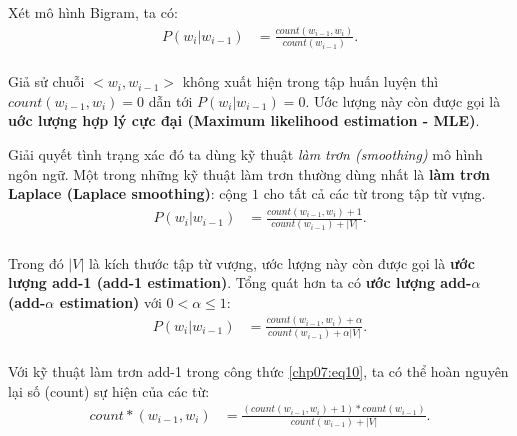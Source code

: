 Xét mô hình Bigram, ta có:
\begin{equation}
\begin{split}
P(w_i|w_{i-1})&=\frac{count(w_{i-1},w_i)}{count(w_{i-1})}.\\
\end{split}
\end{equation}

Giả sử chuỗi $<w_i,w_{i-1}>$ không xuất hiện trong tập huấn luyện thì $count(w_{i-1},w_i)=0$ dẫn tới $P(w_i|w_{i-1})=0$. Ước lượng này còn được gọi là \textbf{uớc lượng hợp lý cực đại (Maximum likelihood estimation - MLE)}.

Giải quyết tình trạng xác đó ta dùng kỹ thuật \textit{làm trơn (smoothing)} mô hình ngôn ngữ. Một trong những kỹ thuật làm trơn thường dùng nhất là \textbf{làm trơn Laplace (Laplace smoothing)}: cộng $1$ cho tất cả các từ trong tập từ vựng. 
\begin{equation}
\label{chp07:eq10}
\begin{split}
P(w_i|w_{i-1})&=\frac{count(w_{i-1},w_i)+1}{count(w_{i-1})+|V|}.\\
\end{split}
\end{equation}

Trong đó $|V|$ là kích thước tập từ vượng, ước lượng này còn được gọi là \textbf{ước lượng add-1 (add-1 estimation)}. Tổng quát hơn ta có \textbf{ước lượng add-$\alpha$ (add-$\alpha$ estimation)} với $0<\alpha \leq 1$:
\begin{equation}
\label{chp07:eq11}
\begin{split}
P(w_i|w_{i-1})&=\frac{count(w_{i-1},w_i)+\alpha}{count(w_{i-1})+\alpha|V|}.\\
\end{split}
\end{equation}

Với kỹ thuật làm trơn add-1 trong công thức \ref{chp07:eq10}, ta có thể hoàn nguyên lại số (count) sự hiện của các từ:
\begin{equation}
\begin{split}
count*(w_{i-1},w_i)&=\frac{(count(w_{i-1},w_i)+1)*count(w_{i-1})}{count(w_{i-1})+|V|}.\\
\end{split}
\end{equation}

